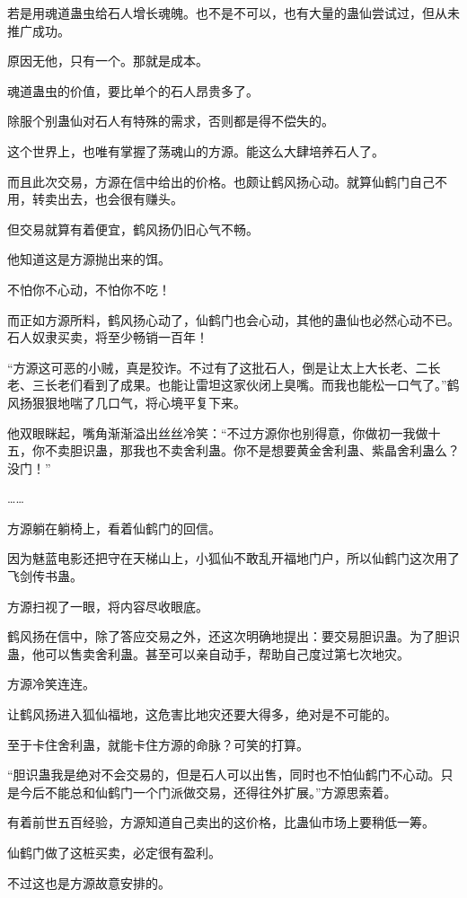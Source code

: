 \begin{this_body}
若是用魂道蛊虫给石人增长魂魄。也不是不可以，也有大量的蛊仙尝试过，但从未推广成功。

原因无他，只有一个。那就是成本。

魂道蛊虫的价值，要比单个的石人昂贵多了。

除服个别蛊仙对石人有特殊的需求，否则都是得不偿失的。

这个世界上，也唯有掌握了荡魂山的方源。能这么大肆培养石人了。

而且此次交易，方源在信中给出的价格。也颇让鹤风扬心动。就算仙鹤门自己不用，转卖出去，也会很有赚头。

但交易就算有着便宜，鹤风扬仍旧心气不畅。

他知道这是方源抛出来的饵。

不怕你不心动，不怕你不吃！

而正如方源所料，鹤风扬心动了，仙鹤门也会心动，其他的蛊仙也必然心动不已。石人奴隶买卖，将至少畅销一百年！

“方源这可恶的小贼，真是狡诈。不过有了这批石人，倒是让太上大长老、二长老、三长老们看到了成果。也能让雷坦这家伙闭上臭嘴。而我也能松一口气了。”鹤风扬狠狠地喘了几口气，将心境平复下来。

他双眼眯起，嘴角渐渐溢出丝丝冷笑：“不过方源你也别得意，你做初一我做十五，你不卖胆识蛊，那我也不卖舍利蛊。你不是想要黄金舍利蛊、紫晶舍利蛊么？没门！”

……

方源躺在躺椅上，看着仙鹤门的回信。

因为魅蓝电影还把守在天梯山上，小狐仙不敢乱开福地门户，所以仙鹤门这次用了飞剑传书蛊。

方源扫视了一眼，将内容尽收眼底。

鹤风扬在信中，除了答应交易之外，还这次明确地提出：要交易胆识蛊。为了胆识蛊，他可以售卖舍利蛊。甚至可以亲自动手，帮助自己度过第七次地灾。

方源冷笑连连。

让鹤风扬进入狐仙福地，这危害比地灾还要大得多，绝对是不可能的。

至于卡住舍利蛊，就能卡住方源的命脉？可笑的打算。

“胆识蛊我是绝对不会交易的，但是石人可以出售，同时也不怕仙鹤门不心动。只是今后不能总和仙鹤门一个门派做交易，还得往外扩展。”方源思索着。

有着前世五百经验，方源知道自己卖出的这价格，比蛊仙市场上要稍低一筹。

仙鹤门做了这桩买卖，必定很有盈利。

不过这也是方源故意安排的。


\end{this_body}
